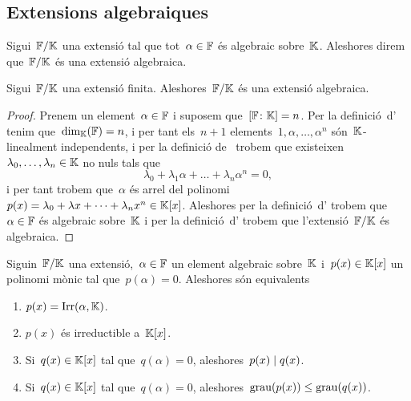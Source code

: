 \documentclass[../Apunts.tex]{subfiles}
\begin{document}
\subsection{Extensions algebraiques}
	\begin{definition}
		\label{def:extensió algebraica}
		Sigui~\(\mathbb{F}/\mathbb{K}\) una extensió tal que tot~\(\alpha\in\mathbb{F}\) és algebraic sobre~\(\mathbb{K}\). Aleshores direm que~\(\mathbb{F}/\mathbb{K}\) és una extensió algebraica.
	\end{definition}
	\begin{proposition}
		\label{prop:les extensions finites són algebraiques}
		Sigui~\(\mathbb{F}/\mathbb{K}\) una extensió finita. Aleshores~\(\mathbb{F}/\mathbb{K}\) és una extensió algebraica.
	\end{proposition}
	\begin{proof}
		Prenem un element~\(\alpha\in\mathbb{F}\) i suposem que~\([\mathbb{F}\colon \mathbb{K}]=n\). Per la definició~d' tenim que~\(\dim_{\mathbb{K}}(\mathbb{F})=n\), i per tant els~\(n+1\) elements~\(1,\alpha,\dots,\alpha^{n}\) són~\(\mathbb{K}\)-linealment independents, %
		i per la definició de~ trobem que existeixen~\(\lambda_{0},\dots,\lambda_{n}\in\mathbb{K}\) no nuls tals que
		\[\lambda_{0}+\lambda_{1}\alpha+\dots+\lambda_{n}\alpha^{n}=0,\]
		i per tant trobem que~\(\alpha\) és arrel del polinomi~\(p(x)=\lambda_{0}+\lambda x+\dots+\lambda_{n}x^{n}\in\mathbb{K}[x]\). Aleshores per la definició~d' trobem que~\(\alpha\in\mathbb{F}\) és algebraic sobre~\(\mathbb{K}\) i per la definició~d' trobem que l'extensió~\(\mathbb{F}/\mathbb{K}\) és algebraica.
	\end{proof}
	\begin{lemma}
		\label{lema:condicions equivalents a polinomi irreductible}
		Siguin~\(\mathbb{F}/\mathbb{K}\) una extensió,~\(\alpha\in\mathbb{F}\) un element algebraic sobre~\(\mathbb{K}\) i~\(p(x)\in\mathbb{K}[x]\) un polinomi mònic tal que~\(p(\alpha)=0\). Aleshores són equivalents
		\begin{enumerate}
		\item\label{lema:condicions equivalents a polinomi irreductible:eq1} \(p(x)=\operatorname{Irr}(\alpha,\mathbb{K})\).
		\item\label{lema:condicions equivalents a polinomi irreductible:eq2} \(p(x)\) és irreductible a~\(\mathbb{K}[x]\).
		\item\label{lema:condicions equivalents a polinomi irreductible:eq3} Si~\(q(x)\in\mathbb{K}[x]\) tal que~\(q(\alpha)=0\), aleshores~\(p(x)\mathrel{|} q(x)\).
		\item\label{lema:condicions equivalents a polinomi irreductible:eq4} Si~\(q(x)\in\mathbb{K}[x]\) tal que~\(q(\alpha)=0\), aleshores~\(\operatorname{grau}(p(x))\leq\operatorname{grau}(q(x))\).
		\end{enumerate}
	\end{lemma}
\end{document}
